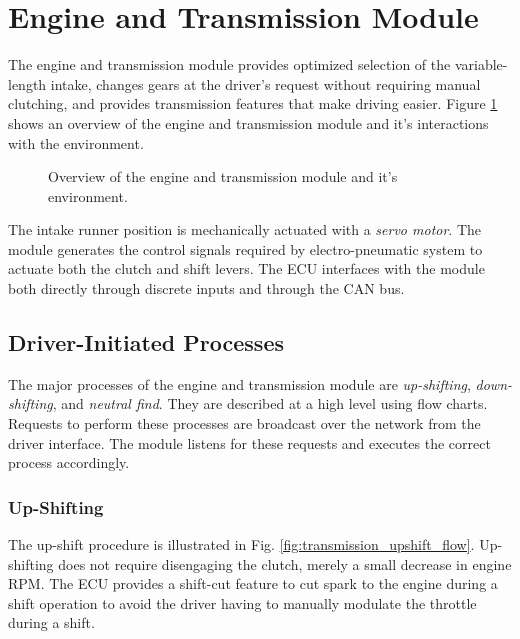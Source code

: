 \section{Engine and Transmission Module\label{sec:engine_transmission_design}}

The engine and transmission module provides optimized selection of the variable-length intake, changes gears at the driver's request without requiring manual clutching, and provides transmission features that make driving easier. Figure \ref{fig:design_engine_overview_block} shows an overview of the engine and transmission module and it's interactions with the environment.

\begin{figure}[H]
	\centering
 	
	\caption{Overview of the engine and transmission module and it's environment.}
	\label{fig:design_engine_overview_block}
\end{figure}

The intake runner position is mechanically actuated with a \emph{servo motor}. The module generates the control signals required by electro-pneumatic system to actuate both the clutch and shift levers. The ECU interfaces with the module both directly through discrete inputs and through the CAN bus.

\subsection{Driver-Initiated Processes}

The major processes of the engine and transmission module are \emph{up-shifting}, \emph{down-shifting}, and \emph{neutral find}. They are described at a high level using flow charts. Requests to perform these processes are broadcast over the network from the driver interface. The module listens for these requests and executes the correct process accordingly.

\subsubsection{Up-Shifting}

The up-shift procedure is illustrated in Fig. \ref{fig:transmission_upshift_flow}. Up-shifting does not require disengaging the clutch, merely a small decrease in engine RPM. The ECU provides a shift-cut feature to cut spark to the engine during a shift operation to avoid the driver having to manually modulate the throttle during a shift.

